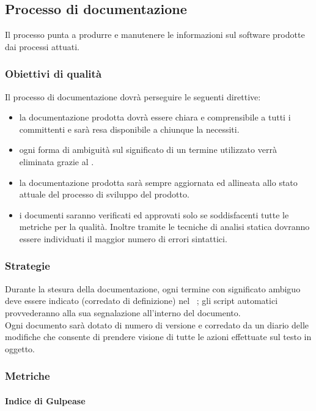 \subsection{Processo di documentazione}

Il processo punta a produrre e manutenere le informazioni sul software prodotte dai processi attuati.
\subsubsection{Obiettivi di qualità}
Il processo di documentazione dovrà perseguire le seguenti direttive:
\begin{itemize}
\item la documentazione prodotta dovrà essere chiara e comprensibile a tutti i committenti e sarà resa disponibile a chiunque la necessiti.
\item ogni forma di ambiguità sul significato di un termine utilizzato verrà eliminata grazie al \glossario.
\item la documentazione prodotta sarà sempre aggiornata ed allineata allo stato attuale del processo di sviluppo del prodotto.
\item i documenti saranno verificati ed approvati solo se soddisfacenti tutte le metriche per la qualità. Inoltre tramite le tecniche di analisi statica dovranno essere individuati il maggior numero di errori sintattici.
\end{itemize}
\subsubsection{Strategie}
Durante la stesura della documentazione, ogni termine con significato ambiguo deve essere indicato (corredato di definizione) nel \glossario\ ; gli script automatici provvederanno alla sua segnalazione all'interno del documento.\\
Ogni documento sarà dotato di numero di versione e corredato da un diario delle modifiche che consente di prendere visione di tutte le azioni effettuate sul testo in oggetto.

\subsubsection{Metriche}

\paragraph{Indice di Gulpease}

